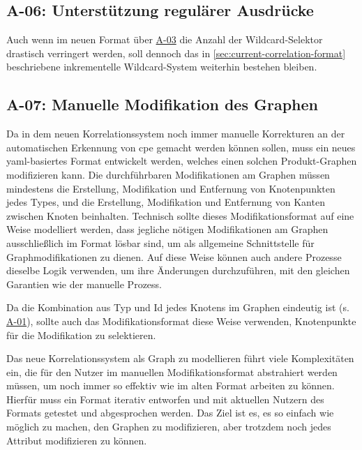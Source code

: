 \subsection{A-06: Unterstützung regulärer Ausdrücke}\label{subsec:req-regex-support}

Auch wenn im neuen Format über \hyperref[subsec:req-type-specific-matching]{A-03} die Anzahl der Wildcard-Selektor drastisch verringert werden, soll dennoch das in \autoref{sec:current-correlation-format} beschriebene inkrementelle Wildcard-System weiterhin bestehen bleiben.

\subsection{A-07: Manuelle Modifikation des Graphen}\label{subsec:req-manual-format-modification}

Da in dem neuen Korrelationssystem noch immer manuelle Korrekturen an der automatischen Erkennung von \acrshort{cpe} gemacht werden können sollen, muss ein neues \acrshort{yaml}-basiertes Format entwickelt werden, welches einen solchen Produkt-Graphen modifizieren kann.
Die durchführbaren Modifikationen am Graphen müssen mindestens die Erstellung, Modifikation und Entfernung von Knotenpunkten jedes Types, und die Erstellung, Modifikation und Entfernung von Kanten zwischen Knoten beinhalten.
Technisch sollte dieses Modifikationsformat auf eine Weise modelliert werden, dass jegliche nötigen Modifikationen am Graphen ausschließlich im Format lösbar sind, um als allgemeine Schnittstelle für Graphmodifikationen zu dienen.
Auf diese Weise können auch andere Prozesse dieselbe Logik verwenden, um ihre Änderungen durchzuführen, mit den gleichen Garantien wie der manuelle Prozess.

Da die Kombination aus Typ und Id jedes Knotens im Graphen eindeutig ist (s. \hyperref[subsec:req-format-product-graph]{A-01}), sollte auch das Modifikationsformat diese Weise verwenden, Knotenpunkte für die Modifikation zu selektieren.

Das neue Korrelationssystem als Graph zu modellieren führt viele Komplexitäten ein, die für den Nutzer im manuellen Modifikationsformat abstrahiert werden müssen, um noch immer so effektiv wie im alten Format arbeiten zu können.
Hierfür muss ein Format iterativ entworfen und mit aktuellen Nutzern des Formats getestet und abgesprochen werden.
Das Ziel ist es, es so einfach wie möglich zu machen, den Graphen zu modifizieren, aber trotzdem noch jedes Attribut modifizieren zu können.

